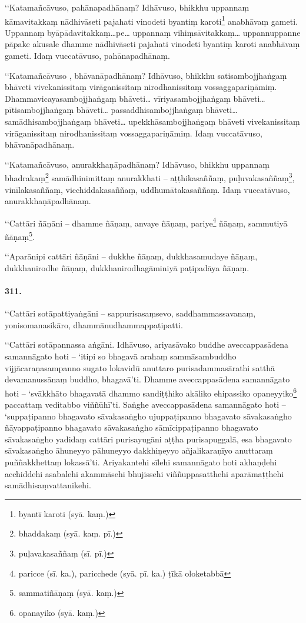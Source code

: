 ‘‘Katamañcāvuso, pahānapadhānaṃ? Idhāvuso, bhikkhu uppannaṃ kāmavitakkaṃ nādhivāseti pajahati vinodeti byantiṃ karoti\footnote{byantī karoti (syā. kaṃ.)} anabhāvaṃ gameti. Uppannaṃ byāpādavitakkaṃ…pe… uppannaṃ vihiṃsāvitakkaṃ… uppannuppanne pāpake akusale dhamme nādhivāseti pajahati vinodeti byantiṃ karoti anabhāvaṃ gameti. Idaṃ vuccatāvuso, pahānapadhānaṃ.

‘‘Katamañcāvuso , bhāvanāpadhānaṃ? Idhāvuso, bhikkhu satisambojjhaṅgaṃ bhāveti vivekanissitaṃ virāganissitaṃ nirodhanissitaṃ vossaggapariṇāmiṃ. Dhammavicayasambojjhaṅgaṃ bhāveti… vīriyasambojjhaṅgaṃ bhāveti… pītisambojjhaṅgaṃ bhāveti… passaddhisambojjhaṅgaṃ bhāveti… samādhisambojjhaṅgaṃ bhāveti… upekkhāsambojjhaṅgaṃ bhāveti vivekanissitaṃ virāganissitaṃ nirodhanissitaṃ vossaggapariṇāmiṃ. Idaṃ vuccatāvuso, bhāvanāpadhānaṃ.

‘‘Katamañcāvuso, anurakkhaṇāpadhānaṃ? Idhāvuso, bhikkhu uppannaṃ bhadrakaṃ\footnote{bhaddakaṃ (syā. kaṃ. pī.)} samādhinimittaṃ anurakkhati – aṭṭhikasaññaṃ, puḷuvakasaññaṃ\footnote{puḷavakasaññaṃ (sī. pī.)}, vinīlakasaññaṃ, vicchiddakasaññaṃ, uddhumātakasaññaṃ. Idaṃ vuccatāvuso, anurakkhaṇāpadhānaṃ.

‘‘Cattāri ñāṇāni – dhamme ñāṇaṃ, anvaye ñāṇaṃ, pariye\footnote{paricce (sī. ka.), paricchede (syā. pī. ka.) ṭīkā oloketabbā} ñāṇaṃ, sammutiyā ñāṇaṃ\footnote{sammatiñāṇaṃ (syā. kaṃ.)}.

‘‘Aparānipi cattāri ñāṇāni – dukkhe ñāṇaṃ, dukkhasamudaye ñāṇaṃ, dukkhanirodhe ñāṇaṃ, dukkhanirodhagāminiyā paṭipadāya ñāṇaṃ.

\paragraph{311.} ‘‘Cattāri sotāpattiyaṅgāni – sappurisasaṃsevo, saddhammassavanaṃ, yonisomanasikāro, dhammānudhammappaṭipatti.

‘‘Cattāri sotāpannassa aṅgāni. Idhāvuso, ariyasāvako buddhe aveccappasādena samannāgato hoti – ‘itipi so bhagavā arahaṃ sammāsambuddho vijjācaraṇasampanno sugato lokavidū anuttaro purisadammasārathi satthā devamanussānaṃ buddho, bhagavā’ti. Dhamme aveccappasādena samannāgato hoti – ‘svākkhāto bhagavatā dhammo sandiṭṭhiko akāliko ehipassiko opaneyyiko\footnote{opanayiko (syā. kaṃ.)} paccattaṃ veditabbo viññūhī’ti. Saṅghe aveccappasādena samannāgato hoti – ‘suppaṭipanno bhagavato sāvakasaṅgho ujuppaṭipanno bhagavato sāvakasaṅgho ñāyappaṭipanno bhagavato sāvakasaṅgho sāmīcippaṭipanno bhagavato sāvakasaṅgho yadidaṃ cattāri purisayugāni aṭṭha purisapuggalā, esa bhagavato sāvakasaṅgho āhuneyyo pāhuneyyo dakkhiṇeyyo añjalikaraṇīyo anuttaraṃ puññakkhettaṃ lokassā’ti. Ariyakantehi sīlehi samannāgato hoti akhaṇḍehi acchiddehi asabalehi akammāsehi bhujissehi viññuppasatthehi aparāmaṭṭhehi samādhisaṃvattanikehi.


